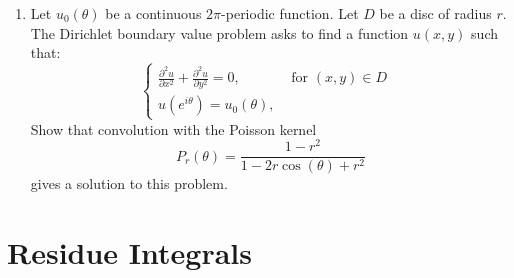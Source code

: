 \documentclass[a4paper,10pt]{article}
\begin{document}
\begin{enumerate}
		
			
		\item Let $u_0(\theta)$ be a continuous $2\pi$-periodic function. 
			Let $D$ be a disc of radius $r$. 
			The Dirichlet boundary value problem asks to find a function $u(x,y)$ such that:
			$$ \begin{cases}
			\frac{\partial^2 u}{\partial x^2} + \frac{\partial^2 u}{\partial y^2} =0, & \mbox{ for $(x,y)\in D$ } \\
			u(e^{i\theta})= u_0(\theta), & 
			\end{cases}
			$$
			Show that convolution with the Poisson kernel 
			$$P_r(\theta) = \frac{1-r^2}{1-2r\cos(\theta) + r^2}$$
			gives a solution to this problem. 
			
	
	

	
\end{enumerate}

\section{Residue Integrals}
\end{document}
